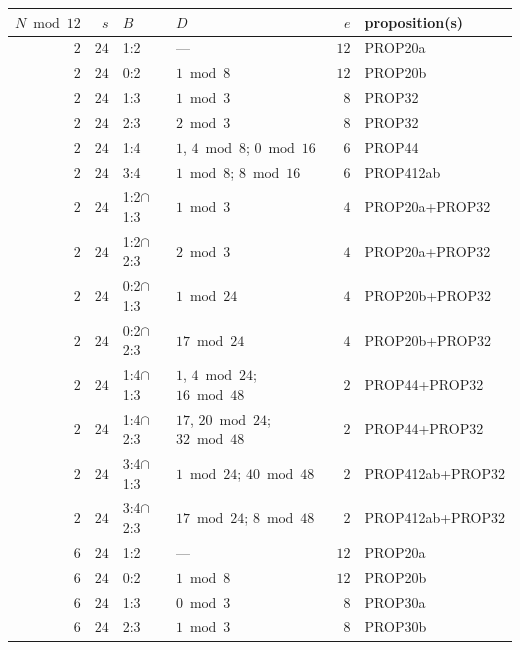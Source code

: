 \documentclass[12pt,twoside,leqno]{article}
\numberwithin{equation}{section}
\begin{document}
\begin{center}
\small
\begin{tabular}{|@{}r|r@{\,}||l|l@{\,}||r@{\,}||l@{}|}\hline
\tiny $N\bmod12$ &  $s$ & $B$          & $D$                            &  $e$ & proposition(s) \\
\hline
 $2$       & $24$ & 1:2          & ---                            & $12$ & PROP20a \\
 $2$       & $24$ & 0:2          & $1\bmod8$                      & $12$ & PROP20b \\
 $2$       & $24$ & 1:3          & $1 \bmod 3$                    &  $8$ & PROP32 \\
 $2$       & $24$ & 2:3          & $2 \bmod 3$                    &  $8$ & PROP32 \\
 $2$       & $24$ & 1:4          & $1$, $4\bmod8$; $0\bmod16$     &  $6$ & PROP44  \\
 $2$       & $24$ & 3:4          & $1\bmod8$; $8\bmod16$          &  $6$ & PROP412ab \\
 $2$       & $24$ & 1:2$\cap$1:3 & $1 \bmod 3$                    &  $4$ & PROP20a+PROP32\\
 $2$       & $24$ & 1:2$\cap$2:3 & $2 \bmod 3$                    &  $4$ & PROP20a+PROP32\\
 $2$       & $24$ & 0:2$\cap$1:3 & $1 \bmod 24$                   &  $4$ & PROP20b+PROP32\\
 $2$       & $24$ & 0:2$\cap$2:3 & $17 \bmod 24$                  &  $4$ & PROP20b+PROP32\\
 $2$       & $24$ & 1:4$\cap$1:3 & $1$, $4\bmod24$; $16\bmod48$   &  $2$ & PROP44+PROP32\\
 $2$       & $24$ & 1:4$\cap$2:3 & $17$, $20\bmod24$; $32\bmod48$ &  $2$ & PROP44+PROP32\\
 $2$       & $24$ & 3:4$\cap$1:3 & $1\bmod24$; $40\bmod48$        &  $2$ & PROP412ab+PROP32\\
 $2$       & $24$ & 3:4$\cap$2:3 & $17\bmod24$; $8\bmod48$        &  $2$ & PROP412ab+PROP32\\
\hline
 $6$       & $24$ & 1:2          & ---                            & $12$ & PROP20a \\
 $6$       & $24$ & 0:2          & $1\bmod8$                      & $12$ & PROP20b \\
 $6$       & $24$ & 1:3          & $0\bmod3$                      &  $8$ & PROP30a\\
 $6$       & $24$ & 2:3          & $1\bmod3$                      &  $8$ & PROP30b\\

\end{tabular}
\end{center}
\end{document}
